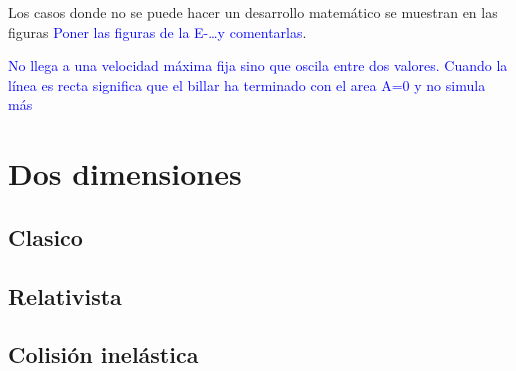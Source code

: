 \documentclass[11pt, spanish]{book}
\begin{document}
\vspace{3mm}

Los casos donde no se puede hacer un desarrollo matemático se muestran en las figuras \textcolor{blue}{Poner las figuras de la E-\ldots y comentarlas}.

\textcolor{blue}{No llega a una velocidad máxima fija sino que oscila entre dos valores. Cuando la línea es recta significa que el billar ha terminado con el area A=0 y no simula más}

\section{Dos dimensiones}

\subsection{Clasico}

\subsection{Relativista}

\subsection{Colisión inelástica}
\end{document}
